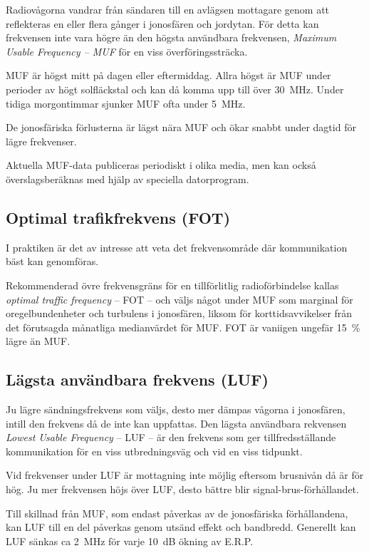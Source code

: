 Radiovågorna vandrar från sändaren till en avlägsen mottagare genom
att reflekteras en eller flera gånger i jonosfären och jordytan. För
detta kan frekvensen inte vara högre än den högsta användbara
frekvensen, \emph{Maximum Usable Frequency -- MUF} för en viss
överföringssträcka.

MUF är högst mitt på dagen eller eftermiddag.
Allra högst är MUF under perioder av högt solfläckstal och kan då komma
upp till över 30~MHz.
Under tidiga morgontimmar sjunker MUF ofta under 5~MHz.

De jonosfäriska förlusterna är lägst nära MUF och ökar snabbt under
dagtid för lägre frekvenser.

Aktuella MUF-data publiceras periodiskt i olika media, men kan också
överslagsberäknas med hjälp av speciella datorprogram.

\subsection{Optimal trafikfrekvens (FOT)}

I praktiken är det av intresse att veta det frekvensområde där
kommunikation bäst kan genomföras.

Rekommenderad övre frekvensgräns för en tillförlitlig radioförbindelse
kallas \emph{optimal traffic frequency} -- FOT -- och väljs något under
MUF som marginal för oregelbundenheter och turbulens i jonosfären,
liksom för korttidsavvikelser från det förutsagda månatliga
medianvärdet för MUF. FOT är vaniigen ungefär 15~\% lägre än MUF.

\subsection{Lägsta användbara frekvens (LUF)}

Ju lägre sändningsfrekvens som väljs, desto mer dämpas vågorna i
jonosfären, intill den frekvens då de inte kan uppfattas. Den lägsta
användbara rekvensen \emph{Lowest Usable Frequency} -- LUF -- är den
frekvens som ger tillfredsställande kommunikation för en viss
utbredningsväg och vid en viss tidpunkt.

Vid frekvenser under LUF är mottagning inte möjlig eftersom brusnivån
då är för hög. Ju mer frekvensen höjs över LUF, desto bättre blir
signal-brus-förhållandet.

Till skillnad från MUF, som endast påverkas av de jonosfäriska
förhållandena, kan LUF till en del påverkas genom utsänd effekt och
bandbredd. Generellt kan LUF sänkas ca 2~MHz för varje 10~dB ökning
av E.R.P.

